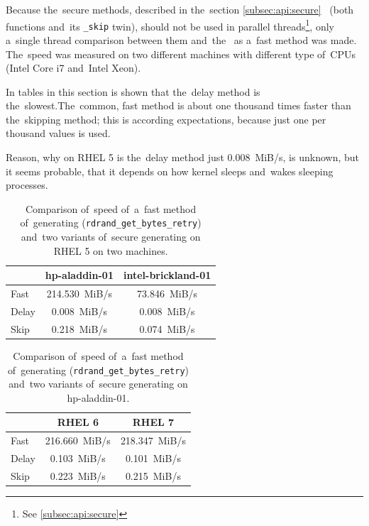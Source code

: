 \par{
Because the~secure methods, described in the~section \ref{subsec:api:secure}~ (both functions  and~its {\tt \_skip} twin), should not be used in parallel threads\footnote{See \ref{subsec:api:secure}}, only a~single thread comparison between them and~the~ as a~fast method was made. The~speed was measured on two different machines with different type of~CPUs (Intel Core i7 and~Intel Xeon).
}

\par{
In tables in this section is shown that the~delay method is the~slowest.The~common, fast method is about one thousand times faster than the~skipping method; this is according expectations, because just one per thousand values is used. 
}

\par{
Reason, why on RHEL 5 is the~delay method just 0.008~MiB/s, is unknown, but it seems probable, that it depends on how kernel sleeps and~wakes sleeping processes.
}

\begin{table}[h!]
\begin{center}
\begin{tabular}{|l|c|c|}
  \hline
   & hp-aladdin-01 & intel-brickland-01\\
  \hline
  Fast & 214.530~MiB/s & 73.846~MiB/s\\ 
  \hline
  Delay &  0.008~MiB/s & 0.008~MiB/s\\
  \hline
  Skip & 0.218~MiB/s & 0.074~MiB/s\\
  \hline
\end{tabular}
\caption{Comparison of~speed of~a~fast method of~generating ({\tt rdrand\_get\_bytes\_retry}) and~two variants of~secure generating on RHEL 5 on two machines.}
\label{tab:testing:fastAndSecure1}
\end{center}
\end{table}


\begin{table}[h!]
\begin{center}
\begin{tabular}{|l|c|c|}
  \hline
   & RHEL 6 & RHEL 7\\
  \hline
  Fast & 216.660~MiB/s & 218.347~MiB/s\\ 
  \hline
  Delay &  0.103~MiB/s & 0.101~MiB/s\\
  \hline
  Skip & 0.223~MiB/s & 0.215~MiB/s\\
  \hline
\end{tabular}
\caption{Comparison of~speed of~a~fast method of~generating ({\tt rdrand\_get\_bytes\_retry}) and~two variants of~secure generating on hp-aladdin-01.}
\label{tab:testing:fastAndSecure2}
\end{center}
\end{table}

